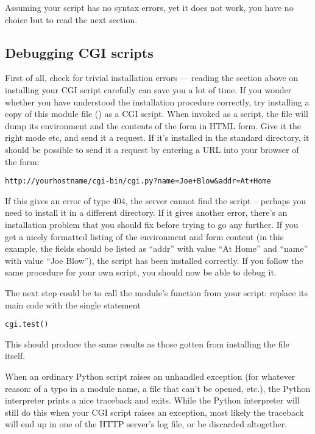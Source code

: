 Assuming your script has no syntax errors, yet it does not work, you
have no choice but to read the next section.


\subsection{Debugging CGI scripts}

First of all, check for trivial installation errors --- reading the
section above on installing your CGI script carefully can save you a
lot of time.  If you wonder whether you have understood the
installation procedure correctly, try installing a copy of this module
file () as a CGI script.  When invoked as a script, the file
will dump its environment and the contents of the form in HTML form.
Give it the right mode etc, and send it a request.  If it's installed
in the standard  directory, it should be possible to send it a
request by entering a URL into your browser of the form:

\begin{verbatim}
http://yourhostname/cgi-bin/cgi.py?name=Joe+Blow&addr=At+Home
\end{verbatim}

If this gives an error of type 404, the server cannot find the script
-- perhaps you need to install it in a different directory.  If it
gives another error, there's an installation problem that
you should fix before trying to go any further.  If you get a nicely
formatted listing of the environment and form content (in this
example, the fields should be listed as ``addr'' with value ``At Home''
and ``name'' with value ``Joe Blow''), the  script has been
installed correctly.  If you follow the same procedure for your own
script, you should now be able to debug it.

The next step could be to call the  module's
 function from your script: replace its main code
with the single statement

\begin{verbatim}
cgi.test()
\end{verbatim}

This should produce the same results as those gotten from installing
the  file itself.

When an ordinary Python script raises an unhandled exception (for
whatever reason: of a typo in a module name, a file that can't be
opened, etc.), the Python interpreter prints a nice traceback and
exits.  While the Python interpreter will still do this when your CGI
script raises an exception, most likely the traceback will end up in
one of the HTTP server's log file, or be discarded altogether.

